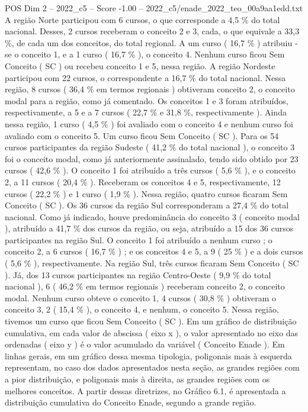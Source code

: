 \begin{textsample}{POS Dim 2 – 2022\_c5 – Score -1.00 – 2022\_c5/enade\_2022\_teo\_00a9aa1edd.txt}
A região Norte participou com 6 cursos, o que corresponde a 4,5 \% do total nacional.
Desses, 2 cursos receberam o conceito 2 e 3, cada, o que equivale a 33,3 \%, de cada um dos conceitos, do total regional.
A um curso ( 16,7 \% ) atribuiu -se o conceito 1, e a 1 curso ( 16,7 \% ), o conceito 4.
Nenhum curso ficou Sem Conceito ( SC ) ou recebeu conceito 1 e 5, nessa região.
A região Nordeste participou com 22 cursos, o correspondente a 16,7 \% do total nacional.
Nessa região, 8 cursos ( 36,4 \% em termos regionais ) obtiveram conceito 2, o conceito modal para a região, como já comentado.
Os conceitos 1 e 3 foram atribuídos, respectivamente, a 5 e a 7 cursos ( 22,7 \% e 31,8 \%, respectivamente ).
Ainda nessa região, 1 curso ( 4,5 \% ) foi avaliado com o conceito 4 e nenhum curso foi avaliado com o conceito 5.
Um curso ficou Sem Conceito ( SC ).
Para os 54 cursos participantes da região Sudeste ( 41,2 \% do total nacional ), o conceito 3 foi o conceito modal, como já anteriormente assinalado, tendo sido obtido por 23 cursos ( 42,6 \% ).
O conceito 1 foi atribuído a três cursos ( 5,6 \% ), e o conceito 2, a 11 cursos ( 20,4 \% ).
Receberam os conceitos 4 e 5, respectivamente, 12 cursos ( 22,2 \% ) e 1 curso ( 1,9 \% ).
Nessa região, quatro cursos ficaram Sem Conceito ( SC ).
Os 36 cursos da região Sul corresponderam a 27,4 \% do total nacional.
Como já indicado, houve predominância do conceito 3 ( conceito modal ), atribuído a 41,7 \% dos cursos da região, ou seja, atribuído a 15 dos 36 cursos participantes na região Sul.
O conceito 1 foi atribuído a nenhum curso ; o conceito 2, a 6 cursos ( 16,7 \% ) ; e os conceitos 4 e 5, a 9 ( 25 \% ) e a dois cursos ( 5,6 \% ), respectivamente.
Na região Sul, três cursos ficaram Sem Conceito ( SC ).
Já, dos 13 cursos participantes na região Centro-Oeste ( 9,9 \% do total nacional ), 6 ( 46,2 \% em termos regionais ) receberam conceito 2, o conceito modal.
Nenhum curso obteve o conceito 1, 4 cursos ( 30,8 \% ) obtiveram o conceito 3, 2 ( 15,4 \% ), o conceito 4, e nenhum, o conceito 5.
Nessa região, tivemos um curso que ficou Sem Conceito ( SC ).
Em um gráfico de distribuição cumulativa, em cada valor de abscissa ( eixo x ), o valor apresentado no eixo das ordenadas ( eixo y ) é o valor acumulado da variável ( Conceito Enade ).
Em linhas gerais, em um gráfico dessa mesma tipologia, poligonais mais à esquerda representam, no caso dos dados apresentados nesta seção, as grandes regiões com a pior distribuição, e poligonais mais à direita, as grandes regiões com os melhores conceitos.
A partir dessas diretrizes, no Gráfico 6.1, é apresentada a distribuição cumulativa do Conceito Enade, segundo a grande região.

\end{textsample}
